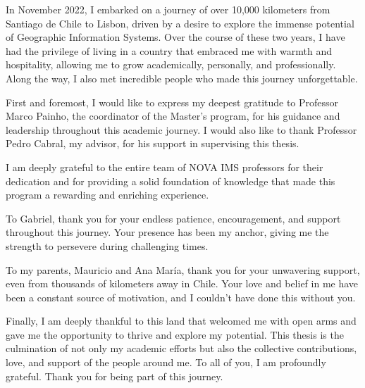 
%

\begin{ntacknowledgements}

In November 2022, I embarked on a journey of over 10,000 kilometers from Santiago de Chile to Lisbon, driven by a desire to explore the immense potential of Geographic Information Systems. Over the course of these two years, I have had the privilege of living in a country that embraced me with warmth and hospitality, allowing me to grow academically, personally, and professionally. Along the way, I also met incredible people who made this journey unforgettable.

First and foremost, I would like to express my deepest gratitude to Professor Marco Painho, the coordinator of the Master's program, for his guidance and leadership throughout this academic journey. I would also like to thank Professor Pedro Cabral, my advisor, for his support in supervising this thesis.

I am deeply grateful to the entire team of NOVA IMS professors for their dedication and for providing a solid foundation of knowledge that made this program a rewarding and enriching experience.

To Gabriel, thank you for your endless patience, encouragement, and support throughout this journey. Your presence has been my anchor, giving me the strength to persevere during challenging times.

To my parents, Mauricio and Ana María, thank you for your unwavering support, even from thousands of kilometers away in Chile. Your love and belief in me have been a constant source of motivation, and I couldn't have done this without you.

Finally, I am deeply thankful to this land that welcomed me with open arms and gave me the opportunity to thrive and explore my potential. This thesis is the culmination of not only my academic efforts but also the collective contributions, love, and support of the people around me. To all of you, I am profoundly grateful. Thank you for being part of this journey.

\end{ntacknowledgements}